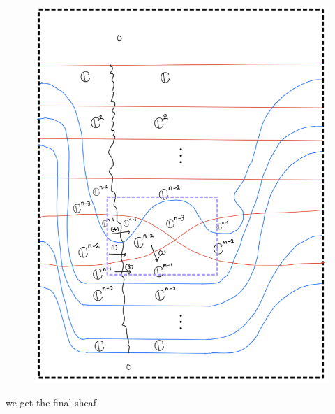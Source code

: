 \begin{enumerate}[label = (\roman*)]
\begin{enumerate}[label = (Case \arabic*)]
\begin{enumerate}[label = (Step \arabic*)]
\begin{figure}[H]
    \centering
    \includegraphics[scale = 0.95]{diagrams/cobord_gen/18.png}
    \caption{}
    \label{fig:your-label}
\end{figure}

we get the final sheaf


\end{enumerate}
\end{enumerate}
\end{enumerate}
